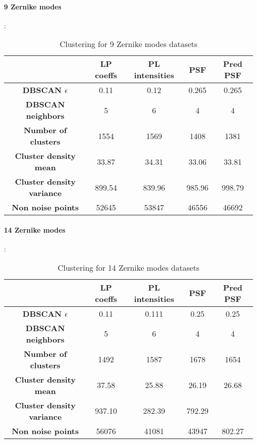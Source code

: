 		\paragraph{9 Zernike modes}:
		\begin{table}[h!]
			\centering
			\begin{tabular}{|c|c|c|c|c|}
				\hline
				\textbf{} & \textbf{LP coeffs} & \textbf{PL intensities} & \textbf{PSF} & \textbf{Pred PSF}\\
				\hline
				\textbf{DBSCAN $\epsilon$} & 0.11 & 0.12 & 0.265 & 0.265\\
				\hline
				\textbf{DBSCAN neighbors} & 5 & 6 & 4 & 4\\
				\hline
				\textbf{Number of clusters} & 1554 & 1569 & 1408 & 1381\\
				\hline
				\textbf{Cluster density mean} & 33.87 & 34.31 & 33.06 & 33.81\\
				\hline
				\textbf{Cluster density variance} & 899.54 & 839.96 & 985.96 & 998.79\\
				\hline
				\textbf{Non noise points} & 52645 & 53847 & 46556 & 46692\\
				\hline
			\end{tabular}
		\caption{Clustering for 9 Zernike modes datasets}
		\end{table}
		\FloatBarrier
		
		\paragraph{14 Zernike modes}:
		\begin{table}[h!]
			\centering
			\begin{tabular}{|c|c|c|c|c|}
				\hline
				\textbf{} & \textbf{LP coeffs} & \textbf{PL intensities} & \textbf{PSF} & \textbf{Pred PSF}\\
				\hline
				\textbf{DBSCAN $\epsilon$} & 0.11 & 0.111 & 0.25 & 0.25\\
				\hline
				\textbf{DBSCAN neighbors} & 5 & 6 & 4 & 4\\
				\hline
				\textbf{Number of clusters} & 1492 & 1587 & 1678 & 1654\\
				\hline
				\textbf{Cluster density mean} & 37.58 & 25.88 & 26.19 & 26.68\\
				\hline
				\textbf{Cluster density variance} & 937.10 & 282.39 & 792.29 & \\
				\hline
				\textbf{Non noise points} & 56076 & 41081 & 43947 & 802.27\\
				\hline
			\end{tabular}
		\caption{Clustering for 14 Zernike modes datasets}
		\end{table}
		\FloatBarrier
		
